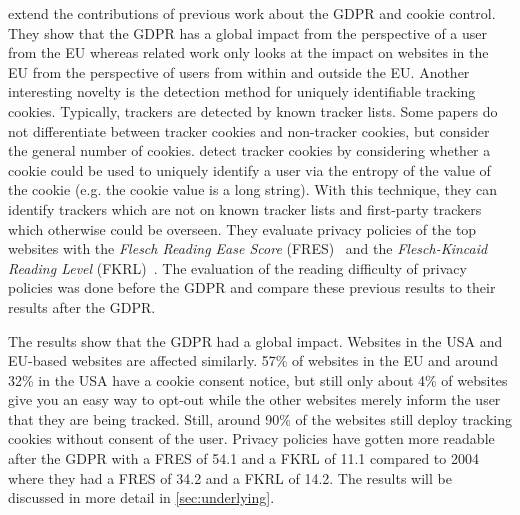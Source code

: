 \citeauthor{sanchez2019can} extend the contributions of previous work about the GDPR and cookie control. They show that
the GDPR has a global impact from the perspective of a user from the EU whereas related work only looks at the impact on
websites in the EU from the perspective of users from within and outside the EU. Another interesting novelty is the
detection method for uniquely identifiable tracking cookies. Typically, trackers are detected by known tracker lists.
Some papers do not differentiate between tracker cookies and non-tracker cookies, but consider the general number of
cookies. \citeauthor{sanchez2019can} detect tracker cookies by considering whether a cookie could be used to uniquely
identify a user via the entropy of the value of the cookie (e.g. the cookie value is a long string).
With this technique, they can identify trackers which are not on known
tracker lists and first-party trackers which otherwise could be overseen. They evaluate privacy policies of the top
websites with the \emph{Flesch Reading Ease Score} (FRES)~\cite{flesch1948new}
and the \emph{Flesch-Kincaid Reading Level} (FKRL)~\cite{kincaid1975derivation}.
The evaluation of the reading difficulty of privacy policies was done before the GDPR and \citeauthor{sanchez2019can}
compare these previous results to their results after the GDPR.

The results show that the GDPR had a global impact. Websites in the USA and EU-based websites are affected
similarly. 57\% of websites in the EU and around 32\% in the USA have a cookie consent notice, but still only about 4\%
of websites give you an easy way to opt-out while the other websites merely inform the user that they are being tracked.
Still, around 90\% of the websites still deploy tracking cookies without consent of the user.
Privacy policies have gotten more readable after the GDPR with a FRES of 54.1 and a FKRL of 11.1 compared to 2004 where they had a
FRES of 34.2 and a FKRL of 14.2. The results will be discussed in more detail in \autoref{sec:underlying}.

